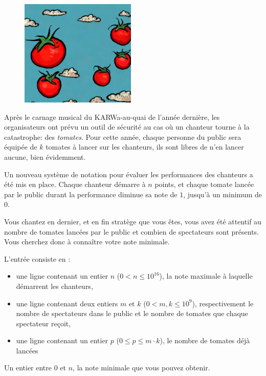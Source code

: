 \problemname{\problemyamlname}

\begin{figure}
    \centering
    \includegraphics[width=5.5cm]{tomates.jpeg}
\end{figure}

Après le carnage musical du KARWa-au-quai de l'année dernière, les organisateurs ont prévu un outil de sécurité au cas où un chanteur tourne à la catastrophe: des \emph{tomates}. Pour cette année, chaque personne du public sera équipée de $k$ tomates à lancer sur les chanteurs, ils sont libres de n'en lancer aucune, bien évidemment.

Un nouveau système de notation pour évaluer les performances des chanteurs a été mis en place. Chaque chanteur démarre à $n$ points, et chaque tomate lancée par le public durant la performance diminue sa note de $1$, jusqu'à un minimum de $0$.

Vous chantez en dernier, et en fin stratège que vous êtes, vous avez été attentif au nombre de tomates lancées par le public et combien de spectateurs sont présents. Vous cherchez donc à connaître votre note minimale.

\begin{Input}
	L'entrée consiste en :
	\begin{itemize}
		\item une ligne contenant un entier $n$ ($0 < n \le 10^{16}$), la note maximale à laquelle démarrent les chanteurs,
		\item une ligne contenant deux entiers $m$ et $k$ ($0 < m,k \le 10^9$), respectivement le nombre de spectateurs dans le public et le nombre de tomates que chaque spectateur reçoit,
		\item une ligne contenant un entier $p$ ($0 \le p \le m \cdot k$), le nombre de tomates déjà lancées
	\end{itemize}
\end{Input}

\begin{Output}
	Un entier entre $0$ et $n$, la note minimale que vous pouvez obtenir.
\end{Output}
